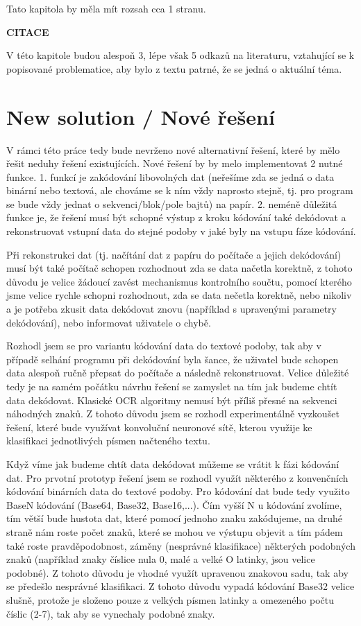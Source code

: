 \documentclass[conference]{IEEEtran}
\begin{document}
Tato kapitola by měla mít rozsah cca 1 stranu.

\textbf{CITACE}

V této kapitole budou alespoň 3, lépe však 5 odkazů na literaturu, vztahující se k popisované problematice, aby bylo z textu patrné, že se jedná o aktuální téma.


\section{New solution / Nové řešení}

V rámci této práce tedy bude nevrženo nové alternativní řešení, které by mělo řešit neduhy řešení existujících. Nové řešení by by melo implementovat 2 nutné funkce. 1. funkcí je zakódování libovolných dat (neřešíme zda se jedná o data binární nebo textová, ale chováme se k ním vždy naprosto stejně, tj. pro program se bude vždy jednat o sekvenci/blok/pole bajtů) na papír. 2. neméně důležitá funkce je, že řešení musí být schopné výstup z kroku kódování také dekódovat a rekonstruovat vstupní data do stejné podoby v jaké byly na vstupu fáze kódování. 

Při rekonstrukci dat (tj. načítání dat z papíru do počítače a jejich dekódování) musí být také počítač schopen rozhodnout zda se data načetla korektně, z tohoto důvodu je velice žádoucí zavést mechanismus kontrolního součtu, pomocí kterého jsme velice rychle schopni rozhodnout, zda se data nečetla korektně, nebo nikoliv a je potřeba zkusit data dekódovat znovu (například s upravenými parametry dekódování), nebo informovat uživatele o chybě.

Rozhodl jsem se pro variantu kódování data do textové podoby, tak aby v případě selhání programu při dekódování byla šance, že uživatel bude schopen data alespoň ručně přepsat do počítače a následně rekonstruovat. Velice důležité tedy je na samém počátku návrhu řešení se zamyslet na tím jak budeme chtít data dekódovat. Klasické OCR algoritmy nemusí být příliš přesné na sekvenci náhodných znaků. Z tohoto důvodu jsem se rozhodl experimentálně vyzkoušet řešení, které bude využívat konvoluční neuronové sítě, kterou využije ke klasifikaci jednotlivých písmen načteného textu.


Když víme jak budeme chtít data dekódovat můžeme se vrátit k fázi kódování dat. Pro prvotní prototyp řešení jsem se rozhodl využít některého z konvenčních kódování binárních data do textové podoby. Pro kódování dat bude tedy využito BaseN kódování (Base64, Base32, Base16,...). Čím vyšší N u kódování zvolíme, tím větší bude hustota dat, které pomocí jednoho znaku zakódujeme, na druhé straně nám roste počet znaků, které se mohou ve výstupu objevit a tím pádem také roste pravděpodobnost, záměny (nesprávné klasifikace) některých podobných znaků (například znaky číslice nula 0, malé a velké O latinky, jsou velice podobné). Z tohoto důvodu je vhodné využít upravenou znakovou sadu, tak aby se předešlo nesprávné klasifikaci. Z tohoto důvodu vypadá kódování Base32 velice slušně, protože je složeno pouze z velkých písmen latinky a omezeného počtu číslic (2-7), tak aby se vynechaly podobné znaky.
\end{document}
